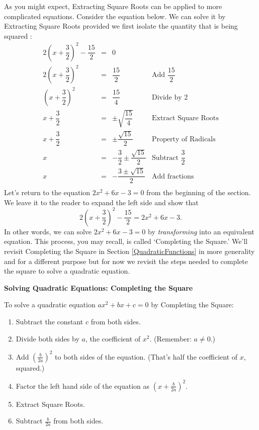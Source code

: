 \documentclass{ximera}
\begin{document}
As you might expect, Extracting Square Roots can be applied to more complicated equations.  Consider the equation below.  We can solve it by Extracting Square Roots provided we first isolate the quantity that is being squared :\[ \begin{array}{rclr}

2\left(x + \dfrac{3}{2}\right)^2 - \dfrac{15}{2} & = & 0 & \\ [8pt]
2\left(x + \dfrac{3}{2}\right)^2 & = & \dfrac{15}{2} & \text{Add $\dfrac{15}{2}$} \\
\left(x + \dfrac{3}{2}\right)^2 & = & \dfrac{15}{4} & \text{Divide by $2$} \\
x + \dfrac{3}{2} & = & \pm \sqrt{\dfrac{15}{4}} & \text{Extract Square Roots} \\ [8pt]
x + \dfrac{3}{2} & = & \pm \dfrac{\sqrt{15}}{2} & \text{Property of Radicals} \\ [5pt]
x & = & -\dfrac{3}{2} \pm \dfrac{\sqrt{15}}{2}  & \text{Subtract $\dfrac{3}{2}$} \\ [8pt]
x & = & -\dfrac{3 \pm \sqrt{15}}{2}  & \text{Add fractions} \\

\end{array} \] Let's return to the equation $2x^2 + 6x - 3 = 0$ from the beginning of the section.  We leave it to the reader to expand the left side and show that \[2\left(x + \dfrac{3}{2}\right)^2 - \dfrac{15}{2} =  2x^2 + 6x - 3. \] In other words, we can solve $2x^2 + 6x - 3 = 0$  by \textit{transforming} into an equivalent equation. This process, you may recall, is called `Completing the Square.'  We'll revisit Completing the Square in Section \ref{QuadraticFunctions} in more generality and for a different purpose but for now we revisit the steps needed to complete the square to solve a quadratic equation.

\medskip

\label{completesquareeqns}


\centerline{\textbf{Solving Quadratic Equations:  Completing the Square}}
\vspace{0.05in}
To solve a quadratic equation $ax^2 + bx + c = 0$ by Completing the Square:

\begin{enumerate}

\item  Subtract the constant $c$ from both sides.
\item  Divide both sides by $a$,  the coefficient of $x^2$.  (Remember:  $a \neq 0$.)
\item  Add $\left(\frac{b}{2a}\right)^2$ to both sides of the equation. (That's half the coefficient of $x$, squared.)
\item  Factor the left hand side of the equation as $\left(x + \frac{b}{2a}\right)^2$.
\item  Extract Square Roots.
\item  Subtract $\frac{b}{2a}$ from both sides.

\end{enumerate}
\end{document}
